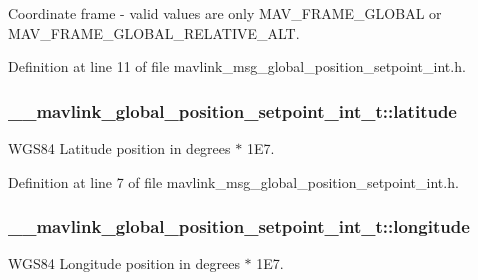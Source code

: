 Coordinate frame -\/ valid values are only M\-A\-V\-\_\-\-F\-R\-A\-M\-E\-\_\-\-G\-L\-O\-B\-A\-L or M\-A\-V\-\_\-\-F\-R\-A\-M\-E\-\_\-\-G\-L\-O\-B\-A\-L\-\_\-\-R\-E\-L\-A\-T\-I\-V\-E\-\_\-\-A\-L\-T. 



Definition at line 11 of file mavlink\-\_\-msg\-\_\-global\-\_\-position\-\_\-setpoint\-\_\-int.\-h.

\hypertarget{struct____mavlink__global__position__setpoint__int__t_a7b02635b701aa77624372077915df167}{
\subsubsection[{latitude}]{ \-\_\-\-\_\-mavlink\-\_\-global\-\_\-position\-\_\-setpoint\-\_\-int\-\_\-t\-::latitude}}\label{struct____mavlink__global__position__setpoint__int__t_a7b02635b701aa77624372077915df167}


W\-G\-S84 Latitude position in degrees $\ast$ 1\-E7. 



Definition at line 7 of file mavlink\-\_\-msg\-\_\-global\-\_\-position\-\_\-setpoint\-\_\-int.\-h.

\hypertarget{struct____mavlink__global__position__setpoint__int__t_a290bd746e9d22250d7a9396afbc8a8b9}{
\subsubsection[{longitude}]{ \-\_\-\-\_\-mavlink\-\_\-global\-\_\-position\-\_\-setpoint\-\_\-int\-\_\-t\-::longitude}}\label{struct____mavlink__global__position__setpoint__int__t_a290bd746e9d22250d7a9396afbc8a8b9}


W\-G\-S84 Longitude position in degrees $\ast$ 1\-E7. 



